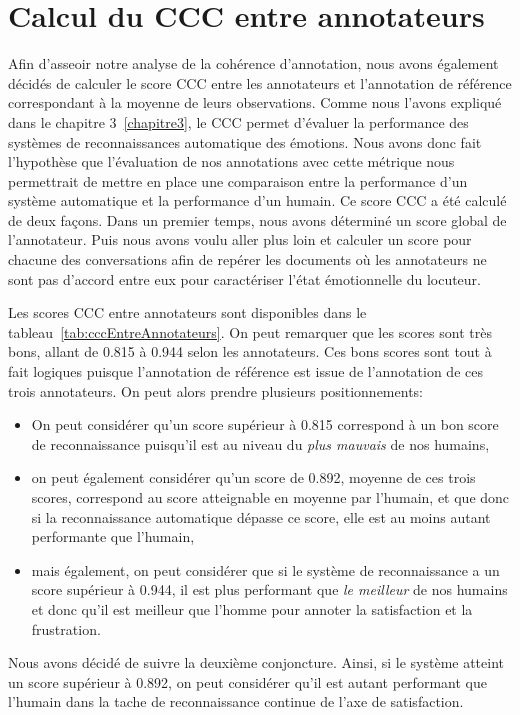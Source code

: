 \section{Calcul du CCC entre annotateurs}
Afin d'asseoir notre analyse de la cohérence d'annotation, nous avons également décidés de calculer le score CCC entre les annotateurs et l'annotation de référence correspondant à la moyenne de leurs observations.
Comme nous l'avons expliqué dans le chapitre 3~\ref{chapitre3}, le CCC permet d'évaluer la performance des systèmes de reconnaissances automatique des émotions. Nous avons donc fait l'hypothèse que l'évaluation de nos annotations avec cette métrique nous permettrait de mettre en place une comparaison entre la performance d'un système automatique et la performance d'un humain.
Ce score CCC a été calculé de deux façons. Dans un premier temps, nous avons déterminé un score global de l'annotateur. Puis nous avons voulu aller plus loin et calculer un score pour chacune des conversations afin de repérer les documents où les annotateurs ne sont pas d'accord entre eux pour caractériser l'état émotionnelle du locuteur.


Les scores CCC entre annotateurs sont disponibles dans le tableau~\ref{tab:cccEntreAnnotateurs}. On peut remarquer que les scores sont très bons, allant de 0.815 à 0.944 selon les annotateurs. Ces bons scores sont tout à fait logiques puisque l'annotation de référence est issue de l'annotation de ces trois annotateurs. On peut alors prendre plusieurs positionnements:
\begin{itemize}
  \item On peut considérer qu'un score supérieur à 0.815 correspond à un bon score de reconnaissance puisqu'il est au niveau du \textit{plus mauvais} de nos humains,
  \item on peut également considérer qu'un score de 0.892, moyenne de ces trois scores, correspond au score atteignable en moyenne par l'humain, et que donc si la reconnaissance automatique dépasse ce score, elle est au moins autant performante que l'humain,
  \item mais également, on peut considérer que si le système de reconnaissance a un score supérieur à 0.944, il est plus performant que \textit{le meilleur} de nos humains et donc qu'il est meilleur que l'homme pour annoter la satisfaction et la frustration.
\end{itemize}

Nous avons décidé de suivre la deuxième conjoncture. Ainsi, si le système atteint un score supérieur à 0.892, on peut considérer qu'il est autant performant que l'humain dans la tache de reconnaissance continue de l'axe de satisfaction.

